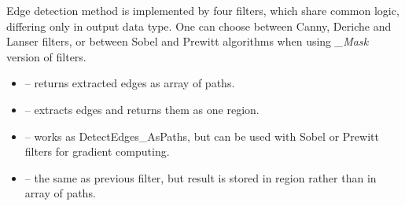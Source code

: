 \begin{refImpl}
Edge detection method is implemented by four \studio filters, which share common logic, differing only in output data type. One can choose between Canny, Deriche and Lanser filters, or between Sobel and Prewitt algorithms when using \textit{\_Mask} version of filters.
\begin{itemize}
	 \item {} -- returns extracted edges as array of paths.
	 \item {} -- extracts edges and returns them as one region.
	 \item {} -- works as DetectEdges\_AsPaths, but can be used with Sobel or Prewitt filters for gradient computing.
	 \item {} -- the same as previous filter, but result is stored in region rather than in array of paths.
\end{itemize}
\end{refImpl}